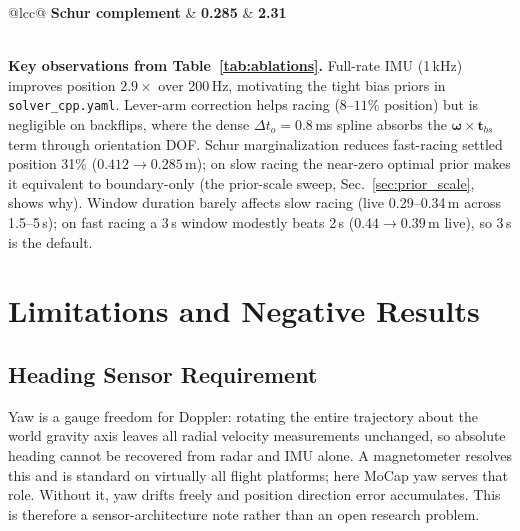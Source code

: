 \documentclass[conference]{IEEEtran}
\begin{document}
\begin{table}[t]
\begin{tabular}{@{}lcc@{}}
\quad \textbf{Schur complement} & \textbf{0.285} & \textbf{2.31} \\
\bottomrule
{}\\
\end{tabular}
\end{table}

\textbf{Key observations from Table~\ref{tab:ablations}.}
Full-rate IMU (1\,kHz) improves position $2.9\times$ over 200\,Hz,
motivating the tight bias priors in \texttt{solver\_cpp.yaml}.
Lever-arm correction helps racing ($8$--$11\%$ position) but is
negligible on backflips, where the dense $\Delta t_o{=}0.8$\,ms spline
absorbs the $\bm{\omega}{\times}\mathbf{t}_{bs}$ term through orientation
DOF.  Schur marginalization reduces fast-racing settled position 31\%
($0.412\to0.285$\,m); on slow racing the near-zero optimal prior makes
it equivalent to boundary-only (the prior-scale sweep,
Sec.~\ref{sec:prior_scale}, shows why).  Window duration barely affects
slow racing (live 0.29--0.34\,m across 1.5--5\,s); on fast racing a 3\,s
window modestly beats 2\,s ($0.44\to0.39$\,m live), so 3\,s is the
default.

\section{Limitations and Negative Results}
\label{sec:limits}

\subsection{Heading Sensor Requirement}
\label{sec:yaw}
Yaw is a gauge freedom for Doppler: rotating the entire trajectory
about the world gravity axis leaves all radial velocity measurements
unchanged, so absolute heading cannot be recovered from radar and IMU
alone.  A magnetometer resolves this and is standard on virtually all
flight platforms; here MoCap yaw serves that role.  Without it, yaw
drifts freely and position direction error accumulates.  This is
therefore a sensor-architecture note rather than an open research
problem.
\end{document}
